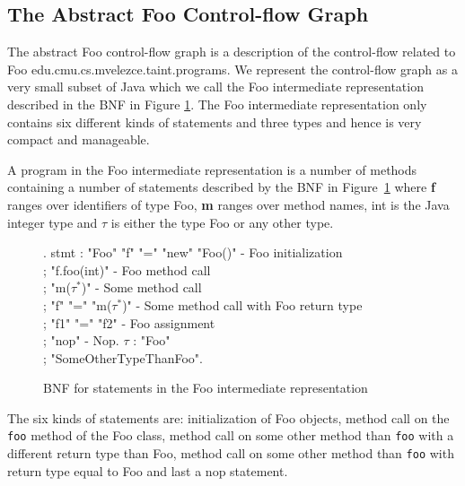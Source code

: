 \documentclass{article}
\newcommand{\code}[1]{\texttt{\small #1}}
\begin{document}
\subsection{The Abstract Foo Control-flow Graph}
The abstract Foo control-flow graph is a description of the
control-flow related to Foo edu.cmu.cs.mvelezce.taint.programs. We represent the control-flow
graph as a very small subset of Java which we call the Foo
intermediate representation described in the BNF in Figure
\ref{fig:stmt:bnf}. The Foo intermediate representation only contains
six different kinds of statements and three types and hence is very
compact and manageable.

A program in the Foo intermediate representation is a number of
methods containing a number of statements described by the BNF in
Figure~\ref{fig:stmt:bnf} where {\bf f} ranges over identifiers of type
Foo, {\bf m} ranges over method names, int is the Java integer type and
$\tau$ is either the type Foo or any other type.

\begin{figure}[!htb]
  \centering
    \vspace{-4ex}\mbox{}.
    stmt : "Foo" "f" "=" "new" "Foo()" - Foo initialization\\
         ; "f.foo(int)" - Foo method call\\
         ; "m($\tau^*$)" - Some method call\\
         ; "f" "=" "m($\tau^*$)" - Some method call with Foo return type\\
         ; "f1" "=" "f2" - Foo assignment\\
         ; "nop" - Nop.
    $\tau$ : "Foo"\\
           ; "SomeOtherTypeThanFoo".
  \end{grammar}
  \caption{BNF for statements in the Foo intermediate representation}
  \label{fig:stmt:bnf}
\end{figure}

The six kinds of statements are: initialization of Foo objects, method
call on the \code{foo} method of the Foo class, method call on some
other method than \code{foo} with a different return type than Foo,
method call on some other method than \code{foo} with return type
equal to Foo and last a nop statement.
\end{document}
